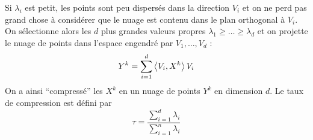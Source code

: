 Si $\lambda_i$ est petit, les points sont peu dispersés dans la direction
$V_i$ et on ne perd pas grand chose à considérer que le nuage est contenu
dans le plan orthogonal à $V_i$. On sélectionne alors les $d$ plus grandes
valeurs propres $\lambda_1 \geq \dots \geq \lambda_d$ et on projette le nuage
de points dans l'espace engendré par $V_1,\dots, V_d$ :
\begin{displaymath}
Y^k = \sum_{i=1}^{d} \left\langle V_i,X^k\right\rangle V_i
\end{displaymath}
On a ainsi ``compressé'' les $X^k$ en un nuage de points $Y^k$ en dimension $d$. Le taux de compression est défini par
\begin{displaymath}
\tau = \frac{\sum_{i=1}^{d} \lambda_i}{\sum_{i=1}^{n} \lambda_i}
\end{displaymath}
%
%
%
